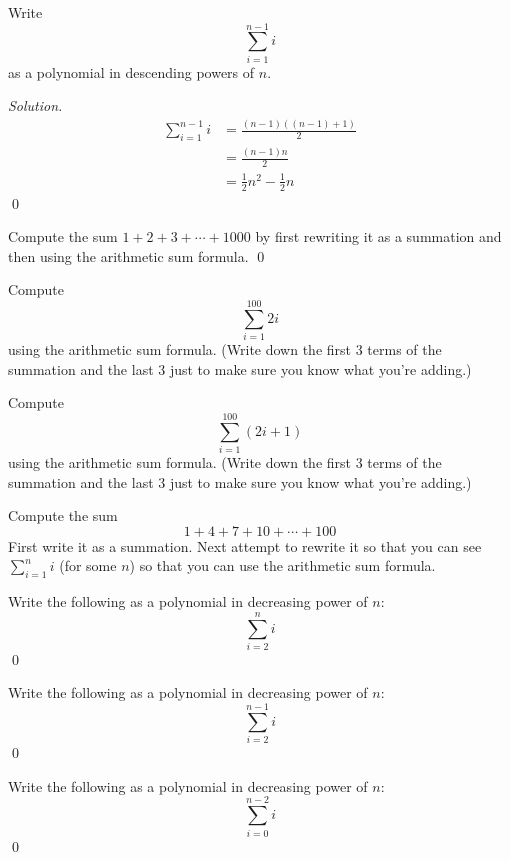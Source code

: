 \begin{eg}
Write
\[
\sum_{i = 1}^{n - 1} i
\]
as a polynomial in descending powers of $n$.
\end{eg}

\textit{Solution.}
\begin{align*}
\sum_{i = 1}^{n - 1} i
&= \frac{(n - 1)((n - 1) + 1)}{2} \\
&= \frac{(n - 1)n}{2} \\
&= \frac{1}{2}n^2 - \frac{1}{2}n
\end{align*}
\qed



\newpage
\begin{ex}
Compute the sum $1 + 2 + 3 + \cdots + 1000$ by first rewriting
it as a summation and then using the arithmetic sum formula.
\qed
\end{ex}



\newpage
\begin{ex}
Compute 
\[
\sum_{i = 1}^{100} 2i
\]
using the arithmetic sum formula.
(Write down the first 3 terms of the summation and the last 3 just
to make sure you know what you're adding.)
\end{ex}


\newpage
\begin{ex}
Compute 
\[
\sum_{i = 1}^{100} (2i + 1)
\]
using the arithmetic sum formula.
(Write down the first 3 terms of the summation and the last 3 just
to make sure you know what you're adding.)
\end{ex}



\newpage
\begin{ex}
Compute the sum
\[
1 + 4 + 7 + 10 + \cdots + 100
\]
First write it as a summation. Next attempt to rewrite it so that you
can see $\sum_{i=1}^n i$ (for some $n$) so that you can use the 
arithmetic sum formula.
\end{ex}


\newpage
\begin{ex} 
Write the following as a polynomial in decreasing power of $n$:
\[
\sum_{i=2}^n i
\]
\qed
\end{ex}


\newpage
\begin{ex} 
Write the following as a polynomial in decreasing power of $n$:
\[
\sum_{i=2}^{n-1} i
\]
\qed
\end{ex}



\newpage
\begin{ex} 
Write the following as a polynomial in decreasing power of $n$:
\[
\sum_{i=0}^{n-2} i
\]
\qed
\end{ex}




